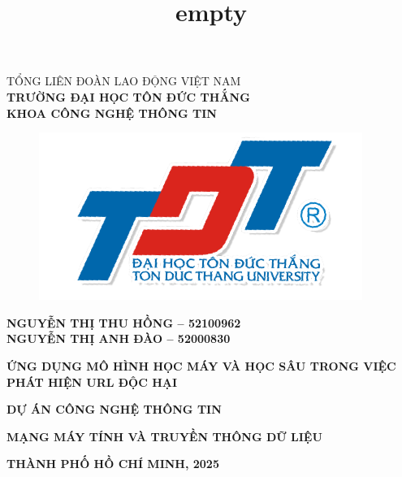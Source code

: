 \documentclass[13pt]{article}
\title{empty}
\begin{document}
	\fontsize{14pt}{20pt}\selectfont
	\begin{center}
		TỔNG LIÊN ĐOÀN LAO ĐỘNG VIỆT NAM \\\textbf{TRƯỜNG ĐẠI HỌC TÔN ĐỨC THẮNG}\\
        \textbf{KHOA CÔNG NGHỆ THÔNG TIN}\\
	\end{center}
	\vspace{1cm}
	\begin{figure}[h]
		\centering
		\includegraphics[width=0.3\linewidth]{image/Logo.png}
	\end{figure}
	\vspace{-1cm}
	\vspace{1cm}
	\fontsize{14pt}{20pt}\selectfont
	\begin{center}
		\textbf{NGUYỄN THỊ THU HỒNG – 52100962}\\
        \textbf{NGUYỄN THỊ ANH ĐÀO – 52000830}
	\end{center}
	\vspace{0.5cm}
	\fontsize{24pt}{20pt}\selectfont
	\begin{center}\Huge
		\textbf{ỨNG DỤNG MÔ HÌNH HỌC MÁY VÀ HỌC SÂU TRONG VIỆC PHÁT HIỆN URL ĐỘC HẠI}	
	\end{center}
    \vspace{0.5cm}
	\fontsize{22pt}{20pt}\selectfont
	\begin{center}
        \textbf{DỰ ÁN CÔNG NGHỆ THÔNG TIN}
	\end{center}\Large
    \vspace{0.5cm}
	\fontsize{22pt}{20pt}\selectfont
	\begin{center}
        \textbf{MẠNG MÁY TÍNH 
        VÀ TRUYỀN THÔNG DỮ LIỆU}
	\end{center}\Large
	\vspace{2cm}
	\fontsize{14pt}{20pt}\selectfont
	\begin{center}
		\textbf{THÀNH PHỐ HỒ CHÍ MINH, 2025}
	\end{center}
\end{document}
